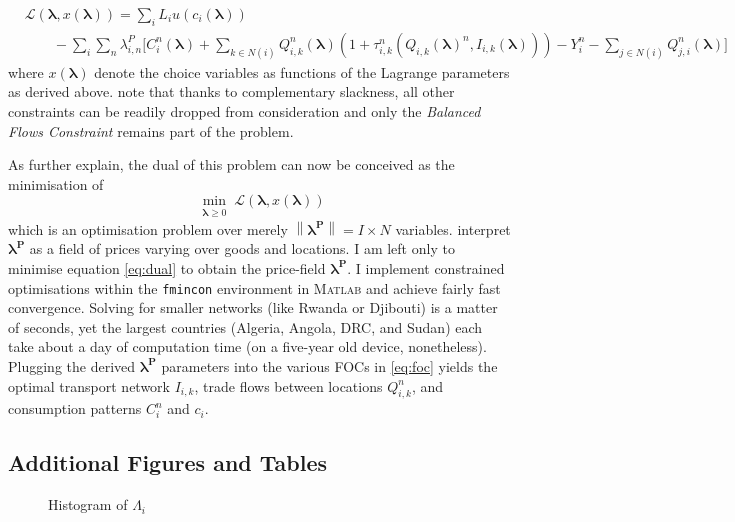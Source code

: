 \documentclass[11pt, oneside]{article}   	%
\begin{document}
\begin{spacing}{1.3}
\begin{equation}
  \label{eq:dual}
  \begin{aligned}
    & \mathcal{L}(\bm{\lambda}, x(\bm{\lambda})) = \sum_{i}^{} L_{i}u(c_{i}(\bm{\lambda})) \\
  & \qquad - \sum_{i}^{}\sum_{n}^{}\lambda^{P}_{i,n}\bigg[ C_{i}^{n}(\bm{\lambda}) + \sum_{k\in N(i)}^{}Q_{i,k}^{n}(\bm{\lambda})(1+\tau_{i,k}^{n}(Q_{i,k}(\bm{\lambda})^{n}, I_{i,k}(\bm{\lambda}))) - Y_{i}^{n} - \sum_{j\in N(i)}^{}Q_{j,i}^{n}(\bm{\lambda}) \bigg]
  \end{aligned}
\end{equation}
where $x(\bm{\lambda})$ denote the choice variables as functions of the Lagrange parameters as derived above. \citeauthor{fajgelbaum_optimal_2017} note that thanks to complementary slackness, all other constraints can be readily dropped from consideration and only the \emph{Balanced Flows Constraint} remains part of the problem.

As \citeauthor{fajgelbaum_optimal_2017} further explain, the dual of this problem can now be conceived as the minimisation of
\begin{equation*}
  \!\min_{\substack{\bm{\lambda} \geq 0}}\mathcal{L}(\bm{\lambda}, x(\bm{\lambda}))
\end{equation*}
which is an optimisation problem over merely $\left\lVert\bm{\lambda^{P}}\right\rVert = I \times N$ variables. \citeauthor{fajgelbaum_optimal_2017} interpret $\bm{\lambda^{P}}$ as a field of prices varying over goods and locations. I am left only to minimise equation \eqref{eq:dual} to obtain the price-field $\bm{\lambda^{P}}$. I implement constrained optimisations within the \texttt{fmincon} environment in \textsc{Matlab} and achieve fairly fast convergence. Solving for smaller networks (like Rwanda or Djibouti) is a matter of seconds, yet the largest countries (Algeria, Angola, DRC, and Sudan) each take about a day of computation time (on a five-year old device, nonetheless). Plugging the derived $\bm{\lambda^{P}}$ parameters into the various FOCs in \eqref{eq:foc} yields the optimal transport network $I_{i,k}$, trade flows between locations $Q_{i,k}^{n}$, and consumption patterns $C_{i}^{n}$ and $c_{i}$.

\vfill
  \subsection{Additional Figures and Tables}


  \begin{figure}[!h]
  \centering
  \caption{Histogram of $\Lambda_{i}$}


\end{figure}
\end{spacing}
\end{document}
